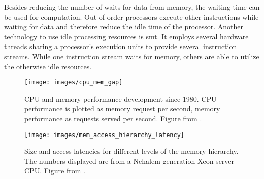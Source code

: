 Besides reducing the number of waits for data from memory, the waiting time can be
used for computation.
Out-of-order processors execute other instructions while waiting for data and
therefore reduce the idle time of the processor.
Another technology to use idle processing resources is \gls{smt}.
It employs several hardware threads sharing a processor's execution units to
provide several instruction streams.
While one instruction stream waits for memory, others are able to utilize the
otherwise idle resources.
%
\begin{figure}[h]
  \centering
  \texttt{[image: images/cpu\_mem\_gap]}
  \caption[Processor and memory performance gap 1980 - 2010.]
    {CPU and memory performance development since 1980.
      CPU performance is plotted as memory request per second, memory
      performance as requests served per second.
      Figure from \cite[73]{hennessy_computer_2012}.}
  \label{intro:fig:cpuMemGap}
\end{figure}
%
\begin{comment}
To reduce the number of waits and obscure the gap, several levels of caches
are present on today's processors, thus decreasing the impact of memory latency.
The drawback of several layers of caches and increasing size of caches is the
access latency and the additional cost for a cache miss, when the data
requested is not in any cache layer.
Each cache level adds the time it takes to search it, to the overall
time it takes to request the data from memory.
Thus, three cache levels cost search time for the first, second, and third plus
the memory latency.
In short, larger caches decrease the miss probability, but increase the overall
memory access latency.
Figure \ref{into:fig:accessLatencies} provides and overview over size and
access times for the memory hierarchy.
The displayed access times describe the duration from issuing the request until
receiving the data.
\end{comment}
%
\begin{figure}[h]
  \texttt{[image: images/mem\_access\_hierarchy\_latency]}
  \caption{Size and access latencies for different levels of the
    memory hierarchy.
    The numbers displayed are from a Nehalem generation
    Xeon\texttrademark{} server CPU.
    Figure from \cite[72]{hennessy_computer_2012}.}
  \label{intro:fig:accessLatencies}
\end{figure}
\begin{comment}
Two hardware improvements minimize the time a CPU idles, while waiting for
memory: out-of-order execution and simultaneous multi-threading.
Out-of-order CPUs reorder instructions, such that a instruction waiting for
input data is surpassed by instructions with available input.
After execution the results are written to memory in their original order.
Whereas simultaneous multi-threading employs two or more hardware threads
executing on the same physical hardware.
If one hardware thread waits for memory or just uses a subset of all available
execution units, the others can utilize the idle resources.
\end{comment}

